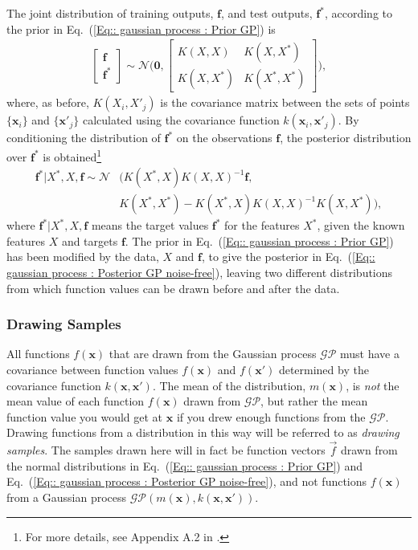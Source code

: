 \documentclass[twoside,english]{uiofysmaster}
\begin{document}
{{The joint distribution of training outputs, $\textbf{f}$, and test outputs, $\textbf{f}^*$, according to the prior in Eq.~(\ref{Eq:: gaussian process : Prior GP}) is
\begin{align}
\begin{bmatrix}
\textbf{f}\\
\textbf{f}^*
\end{bmatrix}
\sim 
\mathcal{N} \Bigg(
\boldsymbol{0},
\begin{bmatrix}
K(X, X) & K(X, X^*)\\
K(X, X^*) & K(X^*, X^*)
\end{bmatrix}
 \Bigg),
\end{align}
where, as before, $K(X_i, X'_j)$ is the covariance matrix between the sets of points $\{ \textbf{x}_i \}$ and $\{\textbf{x}'_j \}$ calculated using the covariance function $k(\textbf{x}_i, \textbf{x}'_j)$. By conditioning the distribution of $\textbf{f}^*$ on the observations $\textbf{f}$,  the posterior distribution over $\textbf{f}^*$ is obtained\footnote{For more details, see Appendix A.2 in \cite{rasmussen2006gaussian}.}  \cite{rasmussen2006gaussian} 
\begin{align}\label{Eq:: gaussian process : Posterior GP noise-free}
\textbf{f}^* \big| X^*, X, \textbf{f} \sim \mathcal{N}&(K(X^*, X)K(X, X)^{-1} \textbf{f}, \nonumber \\ &K(X^*, X^*) - K(X^*, X)K(X, X)^{-1}K(X, X^*)),
\end{align}
where $\textbf{f}^* | X^*, X, \textbf{f}$ means the target values $\textbf{f}^*$ for the features $X^*$, given the known features $X$ and targets $\textbf{f}$. The prior in Eq.~(\ref{Eq:: gaussian process : Prior GP}) has been modified by the data, $X$ and $\textbf{f}$, to give the posterior in Eq.~(\ref{Eq:: gaussian process : Posterior GP noise-free}), leaving two different distributions from which function values can be drawn before and after the data.


\subsubsection{Drawing Samples}

All functions $f(\textbf{x})$ that are drawn from the Gaussian process $\mathcal{GP}$ must have a covariance between function values $f(\textbf{x})$ and $f(\textbf{x}')$ determined by the covariance function $k(\textbf{x}, \textbf{x}')$.  The mean of the distribution, $m(\textbf{x})$, is \textit{not} the mean value of each function $f(\textbf{x})$ drawn from $\mathcal{GP}$, but rather the mean function value you would get at $\textbf{x}$ if you drew enough functions from the $\mathcal{GP}$. Drawing functions from a distribution in this way will be referred to as \textit{drawing samples}. The samples drawn here will in fact be function vectors $\vec{f}$ drawn from the normal distributions in Eq.~(\ref{Eq:: gaussian process : Prior GP}) and Eq.~(\ref{Eq:: gaussian process : Posterior GP noise-free}), and not functions $f(\textbf{x})$ from a Gaussian process $\mathcal{GP}(m(\textbf{x}), k(\textbf{x}, \textbf{x}'))$.

}}
\end{document}

